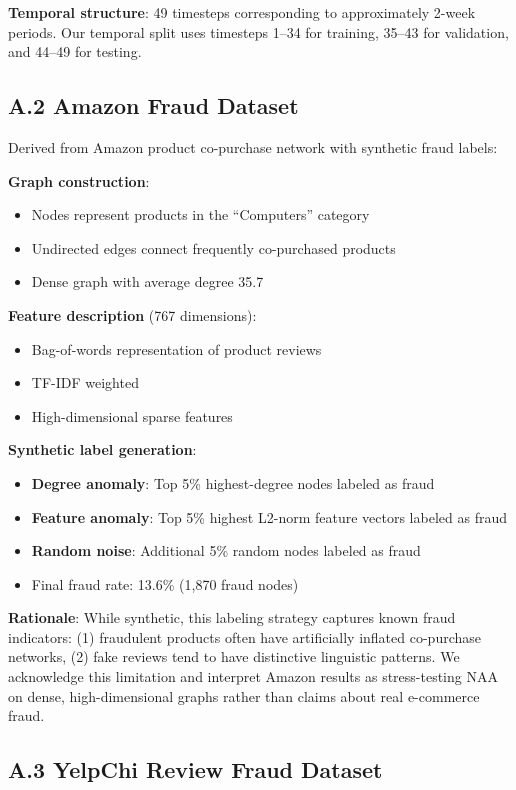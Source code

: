 \textbf{Temporal structure}: 49 timesteps corresponding to approximately 2-week periods. Our temporal split uses timesteps 1--34 for training, 35--43 for validation, and 44--49 for testing.

\subsection*{A.2 Amazon Fraud Dataset}

Derived from Amazon product co-purchase network with synthetic fraud labels:

\textbf{Graph construction}:
\begin{itemize}
\item Nodes represent products in the ``Computers'' category
\item Undirected edges connect frequently co-purchased products
\item Dense graph with average degree 35.7
\end{itemize}

\textbf{Feature description} (767 dimensions):
\begin{itemize}
\item Bag-of-words representation of product reviews
\item TF-IDF weighted
\item High-dimensional sparse features
\end{itemize}

\textbf{Synthetic label generation}:
\begin{itemize}
\item \textbf{Degree anomaly}: Top 5\% highest-degree nodes labeled as fraud
\item \textbf{Feature anomaly}: Top 5\% highest L2-norm feature vectors labeled as fraud
\item \textbf{Random noise}: Additional 5\% random nodes labeled as fraud
\item Final fraud rate: 13.6\% (1,870 fraud nodes)
\end{itemize}

\textbf{Rationale}: While synthetic, this labeling strategy captures known fraud indicators: (1) fraudulent products often have artificially inflated co-purchase networks, (2) fake reviews tend to have distinctive linguistic patterns. We acknowledge this limitation and interpret Amazon results as stress-testing NAA on dense, high-dimensional graphs rather than claims about real e-commerce fraud.

\subsection*{A.3 YelpChi Review Fraud Dataset}

